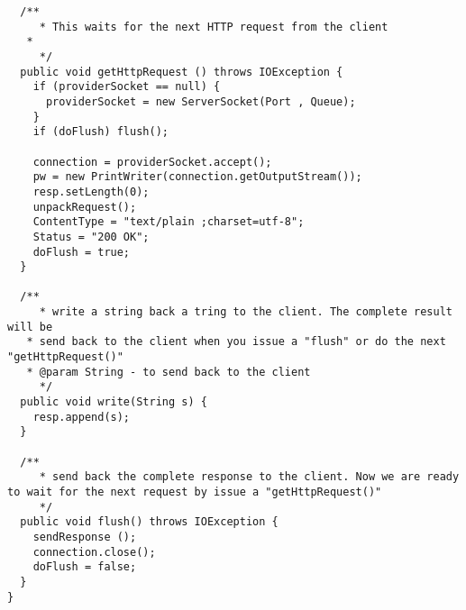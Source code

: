 \begin{lstlisting}
  /**
	 * This waits for the next HTTP request from the client
   *
	 */
  public void getHttpRequest () throws IOException {
    if (providerSocket == null) {
      providerSocket = new ServerSocket(Port , Queue);
    }
    if (doFlush) flush();

    connection = providerSocket.accept();
    pw = new PrintWriter(connection.getOutputStream());
    resp.setLength(0);
    unpackRequest();
    ContentType = "text/plain ;charset=utf-8";
    Status = "200 OK";
    doFlush = true;
  }

  /**
	 * write a string back a tring to the client. The complete result will be
   * send back to the client when you issue a "flush" or do the next "getHttpRequest()"
   * @param String - to send back to the client
	 */
  public void write(String s) {
    resp.append(s);
  }

  /**
	 * send back the complete response to the client. Now we are ready to wait for the next request by issue a "getHttpRequest()"
	 */
  public void flush() throws IOException {
    sendResponse ();
    connection.close();
    doFlush = false;
  }
}
\end{lstlisting}
